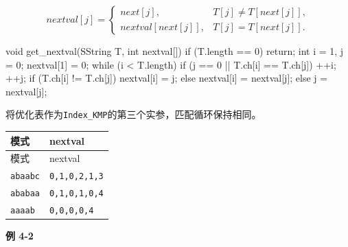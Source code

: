 \[nextval[j]=\begin{cases}
next[j],&T[j]\ne T[next[j]],\\
nextval[next[j]],&T[j]=T[next[j]].
\end{cases}\]

\par\smallskip\noindent\begin{minipage}{\linewidth}
\begin{codeblock}[language={C++}]
void get_nextval(SString T, int nextval[]) {
    if (T.length == 0) return;
    int i = 1, j = 0;
    nextval[1] = 0;
    while (i < T.length) {
        if (j == 0 || T.ch[i] == T.ch[j]) {
            ++i; ++j;
            if (T.ch[i] != T.ch[j])
                nextval[i] = j;
            else
                nextval[i] = nextval[j];
        } else {
            j = nextval[j];
        }
    }
}
\end{codeblock}
\end{minipage}\par\smallskip

将优化表作为\texttt{Index\_KMP}的第三个实参，匹配循环保持相同。

\par\smallskip
{\fontsize{9.3}{12}\selectfont\setlength{\tabcolsep}{2.5pt}\setlength{\LTleft}{0pt}\setlength{\LTright}{0pt}
\begin{longtable}{@{}>{\raggedright\arraybackslash}p{}>{\raggedright\arraybackslash}p{}@{}}
\toprule
模式 & nextval \\

\midrule\endfirsthead\toprule
模式 & nextval \\

\midrule\endhead\bottomrule\endfoot
\texttt{abaabc} & \texttt{0,1,0,2,1,3} \\

\texttt{ababaa} & \texttt{0,1,0,1,0,4} \\

\texttt{aaaab} & \texttt{0,0,0,0,4} \\

\end{longtable}}
\par\smallskip

\par\medskip{}\noindent\hypertarget{DS04-E02}{}\label{DS04-E02}\textbf{例 4-2}\par\nobreak\smallskip

